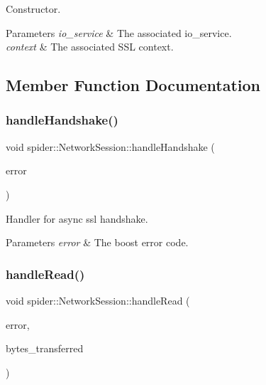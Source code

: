 Constructor. 


\begin{DoxyParams}{Parameters}
{\em io\+\_\+service} & The associated io\+\_\+service. \\
\hline
{\em context} & The associated S\+SL context. \\
\hline
\end{DoxyParams}


\subsection{Member Function Documentation}
\mbox{\label{classspider_1_1_network_session_afeb40632e9a388efbb4bb575f8eec76a}} 
\subsubsection{\texorpdfstring{handle\+Handshake()}{handleHandshake()}}
{\footnotesize\ttfamily void spider\+::\+Network\+Session\+::handle\+Handshake (\begin{DoxyParamCaption}\item[{boost\+::system\+::error\+\_\+code const \&}]{error }\end{DoxyParamCaption})}



Handler for async ssl handshake. 


\begin{DoxyParams}{Parameters}
{\em error} & The boost error code. \\
\hline
\end{DoxyParams}
\mbox{\label{classspider_1_1_network_session_a440bcc8bd0a5403a1b98dcd84ceb8aa3}} 
\subsubsection{\texorpdfstring{handle\+Read()}{handleRead()}}
{\footnotesize\ttfamily void spider\+::\+Network\+Session\+::handle\+Read (\begin{DoxyParamCaption}\item[{boost\+::system\+::error\+\_\+code const \&}]{error,  }\item[{std\+::size\+\_\+t}]{bytes\+\_\+transferred }\end{DoxyParamCaption})}



